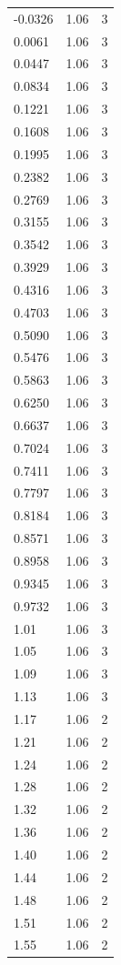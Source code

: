 \begin{longtable}{lrr}
  -0.0326 & 1.06 & 3 \\
  0.0061 & 1.06 & 3 \\
  0.0447 & 1.06 & 3 \\
  0.0834 & 1.06 & 3 \\
  0.1221 & 1.06 & 3 \\
  0.1608 & 1.06 & 3 \\
  0.1995 & 1.06 & 3 \\
  0.2382 & 1.06 & 3 \\
  0.2769 & 1.06 & 3 \\
  0.3155 & 1.06 & 3 \\
  0.3542 & 1.06 & 3 \\
  0.3929 & 1.06 & 3 \\
  0.4316 & 1.06 & 3 \\
  0.4703 & 1.06 & 3 \\
  0.5090 & 1.06 & 3 \\
  0.5476 & 1.06 & 3 \\
  0.5863 & 1.06 & 3 \\
  0.6250 & 1.06 & 3 \\
  0.6637 & 1.06 & 3 \\
  0.7024 & 1.06 & 3 \\
  0.7411 & 1.06 & 3 \\
  0.7797 & 1.06 & 3 \\
  0.8184 & 1.06 & 3 \\
  0.8571 & 1.06 & 3 \\
  0.8958 & 1.06 & 3 \\
  0.9345 & 1.06 & 3 \\
  0.9732 & 1.06 & 3 \\
  1.01 & 1.06 & 3 \\
  1.05 & 1.06 & 3 \\
  1.09 & 1.06 & 3 \\
  1.13 & 1.06 & 3 \\
  1.17 & 1.06 & 2 \\
  1.21 & 1.06 & 2 \\
  1.24 & 1.06 & 2 \\
  1.28 & 1.06 & 2 \\
  1.32 & 1.06 & 2 \\
  1.36 & 1.06 & 2 \\
  1.40 & 1.06 & 2 \\
  1.44 & 1.06 & 2 \\
  1.48 & 1.06 & 2 \\
  1.51 & 1.06 & 2 \\
  1.55 & 1.06 & 2 \\

\end{longtable}
